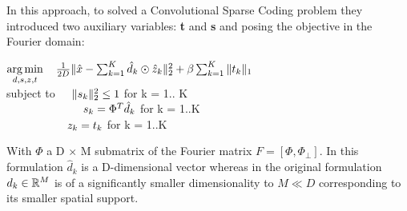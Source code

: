 In this approach, to solved a Convolutional Sparse Coding problem they introduced two auxiliary variables: \textbf{t} and \textbf{s} and posing the objective in the Fourier domain:
\begin{center}
$\underset{d, s, z, t}{\operatorname*{arg\,min}} \hspace{0.4cm} \frac{1}{2D} \| \hat{x} - \sum_{k=1}^{K} \hat{d}_{k} \odot \hat{z}_k \|^2_2 + \beta \sum_{k=1}^{K} \|t_k\|_1$\\
subject to $\hspace{0.4cm} \|s_k\|^2_2 \leq 1 $ for k = 1.. K\\
                $ \hspace{2.4cm}s_k = \Phi^T \hat{d}_k$ for k = 1..K\\
                $\hspace{1.9cm}z_k = t_k$ for k = 1..K
\end{center}
With $\Phi$ a D $\times$ M submatrix of the Fourier matrix $F = [\Phi,\Phi_\bot]$. In this formulation $\hat{d}_k$ is a D-dimensional vector whereas in the original formulation $d_k \in \mathbb{R}^M$  is of a significantly smaller dimensionality to $M \ll D$  corresponding to its smaller spatial support. 
